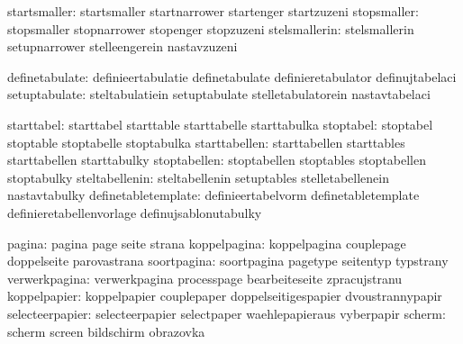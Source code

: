                  startsmaller:  startsmaller                 startnarrower
                                startenger                   startzuzeni
                  stopsmaller:  stopsmaller                  stopnarrower
                                stopenger                    stopzuzeni
                stelsmallerin:  stelsmallerin                setupnarrower
                                stelleengerein               nastavzuzeni

               definetabulate:  definieertabulatie           definetabulate
                                definieretabulator           definujtabelaci
                setuptabulate:  steltabulatiein              setuptabulate
                                stelletabulatorein           nastavtabelaci

                   starttabel:  starttabel                   starttable
                                starttabelle                 starttabulka
                    stoptabel:  stoptabel                    stoptable
                                stoptabelle                  stoptabulka
                starttabellen:  starttabellen                starttables
                                starttabellen                starttabulky
                 stoptabellen:  stoptabellen                 stoptables
                                stoptabellen                 stoptabulky
               steltabellenin:  steltabellenin               setuptables
                                stelletabellenein            nastavtabulky
          definetabletemplate:  definieertabelvorm           definetabletemplate
                                definieretabellenvorlage     definujsablonutabulky

                       pagina:  pagina                       page
                                seite                        strana
                 koppelpagina:  koppelpagina                 couplepage
                                doppelseite                  parovastrana
                  soortpagina:  soortpagina                  pagetype
                                seitentyp                    typstrany
                verwerkpagina:  verwerkpagina                processpage
                                bearbeiteseite               zpracujstranu
                 koppelpapier:  koppelpapier                 couplepaper
                                doppelseitigespapier         dvoustrannypapir
              selecteerpapier:  selecteerpapier              selectpaper
                                waehlepapieraus              vyberpapir
                       scherm:  scherm                       screen
                                bildschirm                   obrazovka


